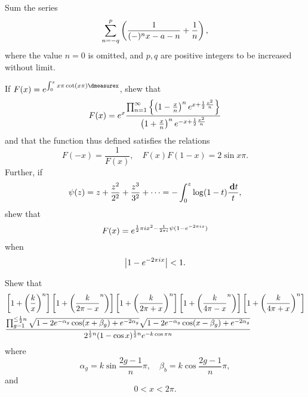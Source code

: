 \begin{wandwmiscexamples}
\begin{wandwmiscexample}
    Sum the series
    $$
    \sum_{n=-q}^{p}
    \left( 
      \frac{1}{(-)^{n} x-a-n}
      +
      \frac{1}{n}
     \right),
    $$
    where the value $n = 0$ is omitted, and $p,q$ are
    positive integers to be increased without
    limit.
  \end{wandwmiscexample}
  \begin{wandwmiscexample}
    If
    $
    F(x)
    =
    e^{\int_{0}^{x} x \pi \cot (x \pi) \dmeasurex}
    $, shew that
    $$
    F(x)
    =
    e^{x}
    \frac{
      \prod_{n=1}^{\infty} \left\{ 
        \left( 1 - \frac{x}{n} \right)^{n}
        e^{x + \frac{1}{2} \frac{x^{2}}{n}}
       \right\}
    }{
      \left( 1 + \frac{x}{n} \right)^{n}
      e^{-x + \frac{1}{2} \frac{x^{2}}{n}}
    }
    $$
    and that the function thus defined satisfies the relations
    $$
    F(-x) = \frac{1}{F(x)},
    \quad
    F(x) F(1-x) = 2 \sin x \pi.
    $$
    Further, if
    $$
    \psi(z)
    =
    z
    + \frac{z^{2}}{2^{2}}
    + \frac{z^{3}}{3^{2}}
    + \cdots
    =
    - \int_{0}^{z} \log (1-t) \frac{\, \mathbf{d} t}{t},
    $$
    shew that
    $$
    F(x)
    =
    e^{\frac{1}{2} \pi i x^{2}
      -
      \frac{1}{2 \pi i}
      \psi( 1 - e^{-2 \pi i x} )
    }
    $$
    when
    $$
    \left|  1 - e^{-2 \pi i x}  \right| < 1.
    $$
  \end{wandwmiscexample}
  \begin{wandwmiscexample}
    Shew that
    \begin{align*}
      &
      \thebracket{
        1 + \theparen{\frac{k}{x}}^{n}
      }
      \thebracket{
        1 + \theparen{\frac{k}{2 \pi - x}^{n}}
      }
      \thebracket{
        1 + \theparen{\frac{k}{2 \pi + x}}^{n}
      }
      \thebracket{
        1 + \theparen{\frac{k}{4 \pi - x}^{n}}
      }
      \thebracket{
        1 + \theparen{\frac{k}{4 \pi + x}}^{n}
      }
      \\
      &
      \hfill
      \frac{
        \prod_{g=1}^{\leq \half n}
        \sqrt{1 - 2 e^{-\alpha_{g}} \cos(x + \beta_{g}) + e^{-2\alpha_{g}}}
        \sqrt{1 - 2 e^{-\alpha_{g}} \cos(x - \beta_{g}) + e^{-2\alpha_{g}}}
      }{
        2^{\half n}
        (1 - \cos x)^{\half n}
        e^{-k \cos \pi n}
      }
    \end{align*}
    where
    $$
    \alpha_{g} = k \sin \frac{2g-1}{n} \pi,
    \quad
    \beta_{b} = k \cos \frac{2g-1}{n} \pi,
    $$
    and
    $$
    0 < x < 2 \pi.
    $$
  \end{wandwmiscexample}

\end{wandwmiscexamples}
